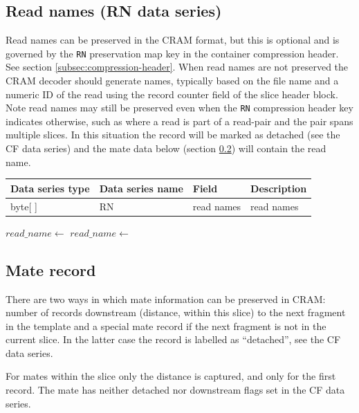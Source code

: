 \documentclass[a4paper]{article}
\begin{document}
\subsection{Read names (RN data series)}
\label{subsec:names}

Read names can be preserved in the CRAM format, but this is optional and is governed by the \texttt{RN} preservation map key in the container compression header. See section \ref{subsec:compression-header}.
When read names are not preserved the CRAM decoder should generate names, typically based on the file name and a numeric ID of the read using the record counter field of the slice header block.
Note read names may still be preserved even when the \texttt{RN} compression header key indicates otherwise, such as where a read is part of a read-pair and the pair spans multiple slices.
In this situation the record will be marked as detached (see the CF data series) and the mate data below (section \ref{subsec:mate}) will contain the read name.

\begin{tabular}{|>{\raggedright}p{70pt}|>{\raggedright}p{75pt}|>{\raggedright}p{90pt}|>{\raggedright}p{171pt}|}
\hline
\textbf{Data series type} & \textbf{Data series name} & \textbf{Field} & \textbf{Description}\tabularnewline
\hline
byte[ ] & RN & read names & read names\tabularnewline
\hline
\end{tabular}

\vskip 20pt
\begin{algorithmic}[1]
  \State $read\_name \gets$ 
\Else
  \State $read\_name \gets$ 
\EndIf
\Statex
\EndProcedure
\end{algorithmic}

\subsection{\textbf{Mate record}}
\label{subsec:mate}

There are two ways in which mate information can be preserved in CRAM: number of records downstream (distance, within this slice) to the next fragment in the template and a special mate record if the next fragment is not in the current slice.
In the latter case the record is labelled as ``detached'', see the CF data series.

For mates within the slice only the distance is captured, and only for the first record.  The mate has neither detached nor downstream flags set in the CF data series.
\end{document}
